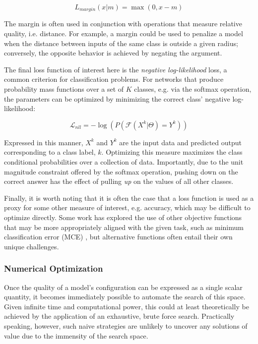 \begin{equation}
\label{eq:mse}
L_{margin}(x | m) = \max(0, x - m)
\end{equation}

\noindent The margin is often used in conjunction with operations that measure relative quality, i.e. distance.
For example, a margin could be used to penalize a model when the distance between inputs of the same class is outside a given radius;
conversely, the opposite behavior is achieved by negating the argument.

The final loss function of interest here is the \emph{negative log-likelihood} loss, a common criterion for classification problems.
For networks that produce probability mass functions over a set of $K$ classes, e.g. via the softmax operation, the parameters can be optimized by minimizing the correct class' negative log-likelihood:

\begin{equation}
\label{eq:nll}
\mathcal{L}_{nll}=-\log(P(\mathcal{F}(X^k |\Theta) = Y^k))
\end{equation}

\noindent Expressed in this manner, $X^k$ and $Y^k$ are the input data and predicted output corresponding to a class label, $k$.
Optimizing this measure maximizes the class conditional probabilities over a collection of data.
Importantly, due to the unit magnitude constraint offered by the softmax operation, pushing down on the correct answer has the effect of pulling \emph{up} on the values of all other classes.

Finally, it is worth noting that it is often the case that a loss function is used as a proxy for some other measure of interest, e.g. accuracy, which may be difficult to optimize directly.
Some work has explored the use of other objective functions that may be more appropriately aligned with the given task, such as minimum classification error (MCE) \cite{Juang1997Minimum}, but alternative functions often entail their own unique challenges.


\subsubsection{Numerical Optimization}
\label{subsubsec:numopt}
Once the quality of a model's configuration can be expressed as a single scalar quantity, it becomes immediately possible to automate the search of this space.
Given infinite time and computational power, this could at least theoretically be achieved by the application of an exhaustive, brute force search.
Practically speaking, however, such naive strategies are unlikely to uncover any solutions of value due to the immensity of the search space.

